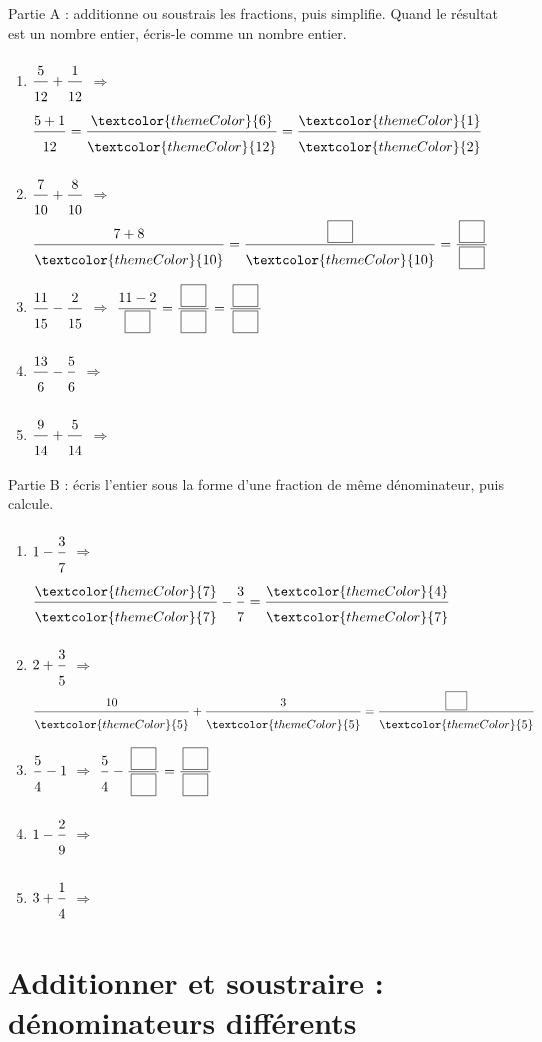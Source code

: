 
\medskip
\textcolor{themeColor}{Partie A} : additionne ou soustrais les fractions, puis simplifie. Quand le résultat est un nombre entier, écris-le comme un nombre entier.

\begin{enumerate}[leftmargin=*,align=parleft, label=\alph*), itemsep=9pt]
\item $\FA{5}{12}+\FA{1}{12}$ \quad $\Longrightarrow$ \quad $\FA{5 + 1}{12}=\FA{\textcolor{themeColor}{6}}{\textcolor{themeColor}{12}}=\FA{\textcolor{themeColor}{1}}{\textcolor{themeColor}{2}}$
\item $\FA{7}{10}+\FA{8}{10}$ \quad $\Longrightarrow$ \quad $\FA{7 + 8}{\textcolor{themeColor}{10}}=\FA{\CaseC}{\textcolor{themeColor}{10}}=\FA{\CaseC}{\CaseC}$
\item $\FA{11}{15}-\FA{2}{15}$ \quad $\Longrightarrow$ \quad $\FA{11 - 2}{\CaseC}=\FA{\CaseC}{\CaseC}=\FA{\CaseC}{\CaseC}$
\item $\FA{13}{6}-\FA{5}{6}$ \quad $\Longrightarrow$
\item $\FA{9}{14}+\FA{5}{14}$ \quad $\Longrightarrow$
\end{enumerate}

\medskip
\textcolor{themeColor}{Partie B} : écris l'entier sous la forme d'une fraction de même dénominateur, puis calcule.

\begin{enumerate}[leftmargin=*,align=parleft, label=\alph*), itemsep=9pt, start=6]
\item $1-\FA{3}{7}$ \quad $\Longrightarrow$ \quad $\FA{\textcolor{themeColor}{7}}{\textcolor{themeColor}{7}}-\FA{3}{7}=\FA{\textcolor{themeColor}{4}}{\textcolor{themeColor}{7}}$
\item $2+\FA{3}{5}$ \quad $\Longrightarrow$ \quad $\FA{10}{\textcolor{themeColor}{5}}+\FA{3}{\textcolor{themeColor}{5}}=\FA{\CaseC}{\textcolor{themeColor}{5}}$
\item $\FA{5}{4}-1$ \quad $\Longrightarrow$ \quad $\FA{5}{4}-\FA{\CaseC}{\CaseC}=\FA{\CaseC}{\CaseC}$
\item $1-\FA{2}{9}$ \quad $\Longrightarrow$
\item $3+\FA{1}{4}$ \quad $\Longrightarrow$
\end{enumerate}

\newpage
\section{Additionner et soustraire : dénominateurs différents}\label{sec:AdditionnerDenominateurDifferent}

